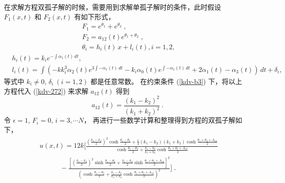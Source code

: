 在求解方程双孤子解的时候，需要用到求解单孤子解时的条件，此时假设 $F_1(x,t)$ 和 $F_2(x,t)$ 有如下形式，
\begin{align}
& F_1=e^{\theta_1}+e^{\theta_2} \;,\\
& F_2=a_{12}(t) e^{\theta_1+\theta_2}  \;,\label{kdv-280}\\
& \theta_{i}=h_{i}(t)\,x+l_{i}(t),i=1,2 \label{kdv-1000},
\end{align}
\begin{align}
& h_{i}(t)=k_i e^{-\int \alpha _1(t) \, dt},\\
& l_{i}(t)=\int \left(- k k_i^3 \alpha _2(t)e^{3 \int -\alpha _1(t) \, dt}-k_i \alpha _0(t) e^{\int -\alpha _1(t) \, dt}+2 \alpha _1(t)-\alpha _3(t)\right) \, dt+\delta_i,
\end{align}
等式中 $k_i\neq 0,\,\delta_i \ (i=1, 2)$ 都是任意常数。
在约束条件 (\ref{kdv-b3}) 下，将以上方程代入 (\ref{kdv-272}) 来求解 $a_{12}(t)$ 得到
\begin{equation}
\ \ a_{12}(t)=\frac{(k_1-k_2)^2}
{(k_1+k_2)^2}\ .
\label{kdv-281}
\end{equation}
令 $\epsilon=1$, $F_i=0, \,i=3,\cdots N $， 再进行一些数学计算和整理得到方程的双孤子解如下，
\begin{align}
 \begin{split}
 &u(x,t) = 12k\big[\frac{(\frac{k_1-k_2}{2})^2 \cosh \frac{\theta_1-\theta_2}{2}
+\frac{1}{4}(k_1-k_2)(k_1+k_2) \cosh \frac{\theta_1+\theta_2+A_{12}}{2}}
{\cosh \frac{\theta_1-\theta_2}{2}+ \frac{k_1-k_2}{k_1+k_2} \cosh \frac{\theta_1+\theta_2+A_{12}}{2} }
   \\
& \quad \quad \quad-\frac{[(\frac{k_1-k_2}{2})^2 \sinh \frac{\theta_1-\theta_2}{2}+
\frac{k_1-k_2}{2} \sinh \frac{\theta_1+\theta_2+A_{12}}{2}]^2}
{(\cosh \frac{\theta_1-\theta_2}{2}+ \frac{k_1-k_2}{k_1+k_2} \cosh \frac{\theta_1+\theta_2+A_{12}}{2} )^2}
\big] \; .  \label{kdv-284}
 \end{split}
\end{align}

\vspace{1mm}
\vspace{2mm}

